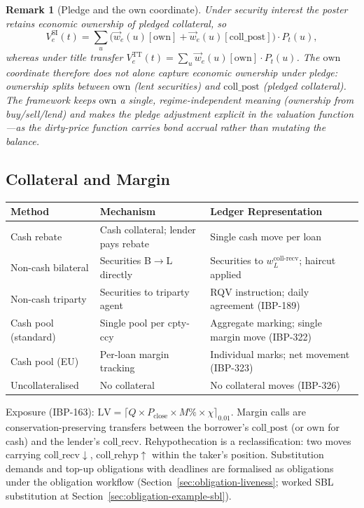 \documentclass[11pt,a4paper]{article}
\newtheorem{remark}[definition]{Remark}
\begin{document}
\begin{remark}[Pledge and the $\mathrm{own}$ coordinate]
Under security interest the poster retains economic ownership of pledged collateral, so
\[
V_e^{\mathrm{SI}}(t) = \sum_u \bigl(\vec{w}_e(u)[\mathrm{own}] + \vec{w}_e(u)[\mathrm{coll\_post}]\bigr)\cdot P_t(u),
\]
whereas under title transfer $V_e^{\mathrm{TT}}(t) = \sum_u \vec{w}_e(u)[\mathrm{own}]\cdot P_t(u)$. The $\mathrm{own}$ coordinate therefore does not alone capture economic ownership under pledge: ownership splits between $\mathrm{own}$ (lent securities) and $\mathrm{coll\_post}$ (pledged collateral). The framework keeps $\mathrm{own}$ a single, regime-independent meaning (ownership from buy/sell/lend) and makes the pledge adjustment explicit in the valuation function---as the dirty-price function carries bond accrual rather than mutating the balance.
\end{remark}

\subsection{Collateral and Margin}
\label{sec:sbl-collateral}

\begin{center}
\small
\begin{tabular}{l p{3.5cm} p{5cm}}
\toprule
\textbf{Method} & \textbf{Mechanism} & \textbf{Ledger Representation} \\
\midrule
Cash rebate & Cash collateral; lender pays rebate & Single cash move per loan \\
Non-cash bilateral & Securities B$\to$L directly & Securities to $w^{\mathrm{coll\text{-}recv}}_L$; haircut applied \\
Non-cash triparty & Securities to triparty agent & RQV instruction; daily agreement (IBP-189) \\
Cash pool (standard) & Single pool per cpty-ccy & Aggregate marking; single margin move (IBP-322) \\
Cash pool (EU) & Per-loan margin tracking & Individual marks; net movement (IBP-323) \\
Uncollateralised & No collateral & No collateral moves (IBP-326) \\
\bottomrule
\end{tabular}
\end{center}

Exposure (IBP-163): $\mathrm{LV} = \lceil Q\times P_{\mathrm{close}}\times M\%\times\chi\rceil_{0.01}$. Margin calls are conservation-preserving transfers between the borrower's $\mathrm{coll\_post}$ (or $\mathrm{own}$ for cash) and the lender's $\mathrm{coll\_recv}$. Rehypothecation is a reclassification: two moves carrying $\mathrm{coll\_recv}\downarrow$, $\mathrm{coll\_rehyp}\uparrow$ within the taker's position. Substitution demands and top-up obligations with deadlines are formalised as obligations under the obligation workflow (Section~\ref{sec:obligation-liveness}; worked SBL substitution at Section~\ref{sec:obligation-example-sbl}).
\end{document}
